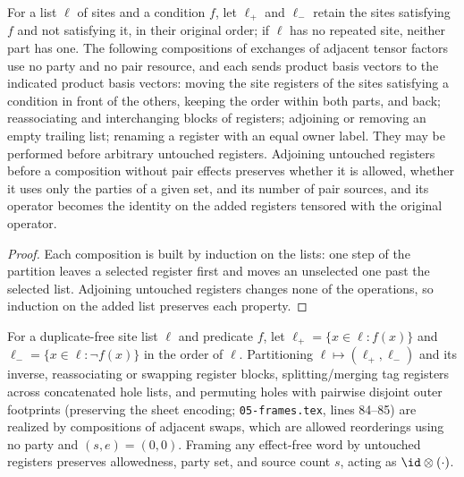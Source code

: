 \begin{lemma}
    \label{lem:lattice_register_reorderings}
    \leanok
    For a list $\ell$ of sites and a condition $f$, let $\ell_+$ and $\ell_-$
    retain the sites satisfying $f$ and not satisfying it, in their original
    order; if $\ell$ has no repeated site, neither part has one. The following
    compositions of exchanges of adjacent tensor factors use no party and no pair
    resource, and each sends product basis vectors to the indicated product basis
    vectors: moving the site registers of the sites satisfying a condition in front
    of the others, keeping the order within both parts, and back; reassociating and
    interchanging blocks of registers; adjoining or removing an empty trailing list;
    renaming a register with an equal owner label. They may be performed before
    arbitrary untouched registers. Adjoining untouched registers before a
    composition without pair effects preserves whether it is allowed, whether it
    uses only the parties of a given set, and its number of pair sources, and its
    operator becomes the identity on the added registers tensored with the original
    operator.
\end{lemma}

\begin{proof}\leanok
    Each composition is built by induction on the lists: one step of the
    partition leaves a selected register first and moves an unselected one past
    the selected list. Adjoining untouched registers changes none of the
    operations, so induction on the added list preserves each property.
\end{proof}

\begin{lemma}
    \label{lem:peps_register_reorderings}
    \leanok
    For a duplicate-free site list $\ell$ and predicate $f$, let $\ell_+=\{x\in\ell:f(x)\}$
    and $\ell_-=\{x\in\ell:\neg f(x)\}$ in the order of $\ell$. Partitioning
    $\ell\mapsto(\ell_+,\ell_-)$ and its inverse, reassociating or swapping
    register blocks, splitting/merging tag registers across concatenated hole
    lists, and permuting holes with pairwise disjoint outer footprints (preserving
    the sheet encoding; \texttt{05-frames.tex}, lines 84--85) are realized by
    compositions of adjacent swaps, which are allowed reorderings using no
    party and $(s,e)=(0,0)$. Framing any effect-free word by untouched
    registers preserves allowedness, party set, and source count $s$, acting as
    $\id\otimes(\cdot)$.
\end{lemma}

